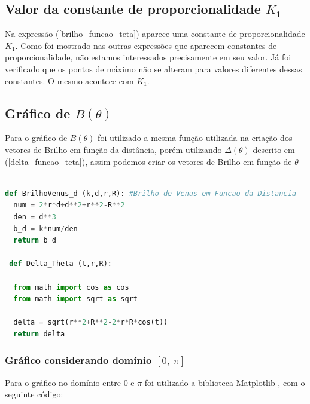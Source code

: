 \documentclass[a4paper, 12pt]{article}
\begin{document}
\subsection{Valor da constante de proporcionalidade $K_1$}
Na expressão (\ref{brilho_funcao_teta}) aparece uma constante de proporcionalidade $K_1$. Como foi mostrado nas outras expressões que aparecem constantes de proporcionalidade, não estamos interessados precisamente em seu valor. Já foi verificado que os pontos de máximo não se alteram para valores diferentes dessas constantes. O mesmo acontece com $K_1$.

\subsection{Gráfico de $B\left(\theta \right)$}

Para o gráfico de $B(\theta)$ foi utilizado a mesma função utilizada na criação dos vetores de Brilho em função da distância, porém utilizando $\Delta(\theta)$ descrito em (\ref{delta_funcao_teta}), assim podemos criar os vetores de Brilho em função de $\theta$

\begin{lstlisting}[language=Python, caption=Brilho de Vênus ($\Delta$) e $\Delta(\theta)$, label=listing_B(delta)_(delta_theta] 

def BrilhoVenus_d (k,d,r,R): #Brilho de Venus em Funcao da Distancia
  num = 2*r*d+d**2+r**2-R**2
  den = d**3
  b_d = k*num/den
  return b_d
  
 def Delta_Theta (t,r,R): 

  from math import cos as cos
  from math import sqrt as sqrt
  
  delta = sqrt(r**2+R**2-2*r*R*cos(t))
  return delta

\end{lstlisting}

\subsubsection{Gráfico considerando domínio $[0,\ \pi]$}

Para o gráfico no domínio entre 0 e $\pi$ foi utilizado a biblioteca Matplotlib \citep{Biblioteca_Matplotlib}, com o seguinte código:
\end{document}
